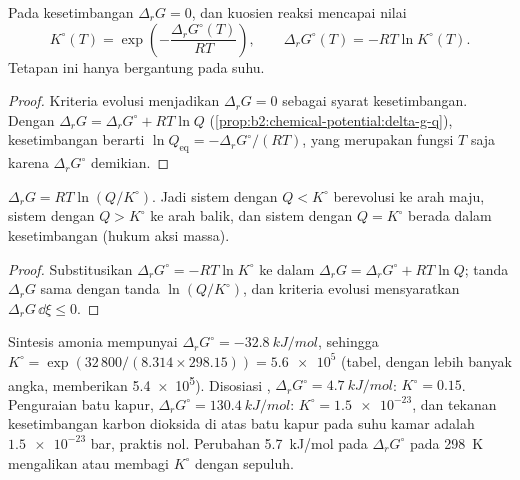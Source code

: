 \begin{theorem}\label{thm:b2:equilibrium-shifts:k-from-g}
Pada kesetimbangan $\Delta_r G = 0$, dan kuosien reaksi mencapai nilai
\[
  K^\circ(T) = \exp\!\left(-\frac{\Delta_r G^\circ(T)}{RT}\right), \qquad
  \Delta_r G^\circ(T) = -RT\ln K^\circ(T) .
\]
Tetapan ini hanya bergantung pada suhu.
\end{theorem}

\begin{proof}
Kriteria evolusi menjadikan $\Delta_r G = 0$ sebagai syarat kesetimbangan.
Dengan $\Delta_r G = \Delta_r G^\circ + RT\ln Q$
(\cref{prop:b2:chemical-potential:delta-g-q}), kesetimbangan berarti
$\ln Q_{\text{eq}}
= -\Delta_r G^\circ/(RT)$, yang merupakan fungsi $T$
saja karena $\Delta_r G^\circ$ demikian.
\end{proof}

\begin{corollary}\label{cor:b2:equilibrium-shifts:mass-action}
$\Delta_r G = RT\ln(Q/K^\circ)$. Jadi sistem dengan $Q < K^\circ$
berevolusi ke arah maju, sistem dengan $Q > K^\circ$ ke arah balik, dan
sistem dengan $Q = K^\circ$ berada dalam kesetimbangan (hukum aksi massa).
\end{corollary}

\begin{proof}
Substitusikan $\Delta_r G^\circ = -RT\ln K^\circ$ ke dalam
$\Delta_r G = \Delta_r G^\circ
+ RT\ln Q$; tanda $\Delta_r G$ sama dengan
tanda $\ln(Q/K^\circ)$, dan kriteria evolusi mensyaratkan
$\Delta_r G\,\dd\xi \leq 0$.
\end{proof}

\begin{example}\label{ex:b2:equilibrium-shifts:constants}
Sintesis amonia mempunyai $\Delta_r G^\circ = \qty{-32.8}{kJ/mol}$, sehingga
$K^\circ =
\exp(32\,800/(8.314 \times 298.15)) = \num{5.6e5}$ (tabel, dengan lebih
banyak angka, memberikan \num{5.4e5}). Disosiasi ,
$\Delta_r G^\circ =
\qty{+4.7}{kJ/mol}$: $K^\circ = 0.15$. Penguraian batu
kapur, $\Delta_r G^\circ = \qty{+130.4}{kJ/mol}$: $K^\circ = \num{1.5e-23}$,
dan tekanan kesetimbangan karbon dioksida di atas batu kapur pada suhu
kamar adalah $\num{1.5e-23}$ bar, praktis nol. Perubahan
\qty{5.7}{kJ/mol} pada $\Delta_r G^\circ$ pada \qty{298}{K} mengalikan
atau membagi $K^\circ$ dengan sepuluh.
\end{example}

